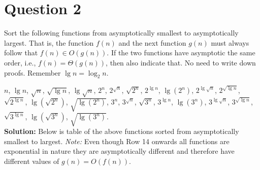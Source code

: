 \documentclass[11pt]{article}
\begin{document}
\section{Question 2}

Sort the following functions from asymptotically smallest to asymptotically largest. That is, the function $f(n)$ and the next function $g(n)$ must always follow that $f(n) \in O(g(n))$. If the two functions have asymptotic the same order, i.e., $f(n)=\Theta(g(n))$, then also indicate that. No need to write down proofs.  Remember $\lg n=\log_2 n$.
  
$n$, $\lg n$, $\sqrt{n}$, $\sqrt{\lg n}$, $\lg \sqrt{n}$, $2^n$, $2^{\sqrt{n}}$, $\sqrt{2^n}$, $2^{\lg n}$, $\lg(2^n)$, $2^{\lg \sqrt{n}}$, $2^{\sqrt{\lg n}}$, $\sqrt{2^{\lg n}}$, $\lg (\sqrt{2^n})$, $\sqrt{\lg (2^n)}$,  $3^n$, $3^{\sqrt{n}}$, $\sqrt{3^n}$, $3^{\lg n}$, $\lg(3^n)$, $3^{\lg \sqrt{n}}$, $3^{\sqrt{\lg n}}$, $\sqrt{3^{\lg n}}$, $\lg (\sqrt{3^n})$, $\sqrt{\lg (3^n)}$. \\

\textbf{Solution:} Below is table of the above functions sorted from asymptotically smallest to largest. \textit{Note:} Even though Row 14 onwards all functions are exponential in nature they are asymptotically different and therefore have different values of $g(n)=O(f(n))$.

\newcommand\rownumber{\stepcounter{rownumbers}\arabic{rownumbers}}
\end{document}
